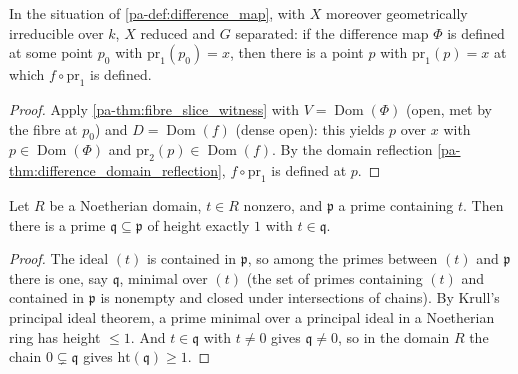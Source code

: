\begin{theorem}
  \label{pa-thm:difference_slice_witness}
  \leanok

  In the situation of \ref{pa-def:difference_map}, with \(X\) moreover
  geometrically irreducible over \(k\), \(X\) reduced and \(G\) separated:
  if the difference map \(\Phi\) is defined at some point \(p_0\) with
  \(\mathrm{pr}_1(p_0) = x\), then there is a point \(p\) with
  \(\mathrm{pr}_1(p) = x\) at which \(f \circ \mathrm{pr}_1\) is defined.
\end{theorem}
\begin{proof}
  \leanok
  Apply \ref{pa-thm:fibre_slice_witness} with \(V = \operatorname{Dom}(\Phi)\)
  (open, met by the fibre at \(p_0\)) and \(D = \operatorname{Dom}(f)\)
  (dense open): this yields \(p\) over \(x\) with \(p \in
  \operatorname{Dom}(\Phi)\) and \(\mathrm{pr}_2(p) \in \operatorname{Dom}(f)\).
  By the domain reflection \ref{pa-thm:difference_domain_reflection}, \(f \circ
  \mathrm{pr}_1\) is defined at \(p\).
\end{proof}

\begin{theorem}
  \label{pa-thm:krull_height_one_transport}
  \leanok

  Let \(R\) be a Noetherian domain, \(t \in R\) nonzero, and \(\mathfrak p\) a
  prime containing \(t\). Then there is a prime
  \(\mathfrak q \subseteq \mathfrak p\) of height exactly \(1\) with
  \(t \in \mathfrak q\).
\end{theorem}
\begin{proof}
  \leanok
  The ideal \((t)\) is contained in \(\mathfrak p\), so among the primes between
  \((t)\) and \(\mathfrak p\) there is one, say \(\mathfrak q\), minimal over
  \((t)\) (the set of primes containing \((t)\) and contained in
  \(\mathfrak p\) is nonempty and closed under intersections of chains). By
  Krull's principal ideal theorem, a prime minimal over a principal ideal in a
  Noetherian ring has height \(\leq 1\). And \(t \in \mathfrak q\) with
  \(t \neq 0\) gives \(\mathfrak q \neq 0\), so in the domain \(R\) the chain
  \(0 \subsetneq \mathfrak q\) gives \(\mathrm{ht}(\mathfrak q) \geq 1\).
\end{proof}

